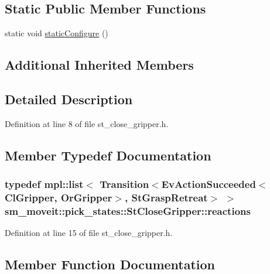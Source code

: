\subsection*{Static Public Member Functions}
\begin{DoxyCompactItemize}
\item 
static void \hyperlink{structsm__moveit_1_1pick__states_1_1StCloseGripper_a1eb83e8ead707d9b9b92255070ea2fe5}{static\+Configure} ()
\end{DoxyCompactItemize}
\subsection*{Additional Inherited Members}


\subsection{Detailed Description}


Definition at line 8 of file st\+\_\+close\+\_\+gripper.\+h.



\subsection{Member Typedef Documentation}
\subsubsection[{\texorpdfstring{reactions}{reactions}}]{\setlength{\rightskip}{0pt plus 5cm}typedef mpl\+::list$<$ Transition$<$Ev\+Action\+Succeeded$<${\bf Cl\+Gripper}, {\bf Or\+Gripper}$>$, {\bf St\+Grasp\+Retreat}$>$ $>$ {\bf sm\+\_\+moveit\+::pick\+\_\+states\+::\+St\+Close\+Gripper\+::reactions}}\hypertarget{structsm__moveit_1_1pick__states_1_1StCloseGripper_a2633bb75744ad12db32d6e874d7152fd}{}\label{structsm__moveit_1_1pick__states_1_1StCloseGripper_a2633bb75744ad12db32d6e874d7152fd}


Definition at line 15 of file st\+\_\+close\+\_\+gripper.\+h.



\subsection{Member Function Documentation}
